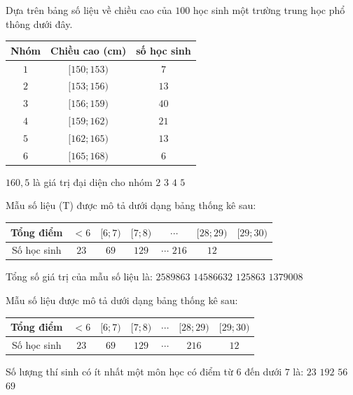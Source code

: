 \begin{ex}%
	Dựa trên bảng số liệu về  chiều cao của $100$ học sinh một trường trung học phổ thông dưới đây.
	\begin{center}
		\begin{tabular}{|c|c|c|}
			\hline 
			Nhóm & Chiều cao  (cm) & số học sinh \\
			 \hline
			$1$ &  $[150;153)$ & $7$ \\
			 \hline
			$2$  & $[153;156)$ & $13$ \\
			 \hline
			 $3$ & $[156;159)$ & $40$ \\
			\hline 
			$4$ &  $[159;162)$ & $21$ \\
			 \hline
			 $5$ & $[162;165)$ & $13$ \\
			 \hline
			$6$ & $[165;168)$ & $6$  \\
			 \hline
		\end{tabular}
	\end{center}
	$160{,}5$ là giá trị đại diện cho  nhóm
	\choice 
		 {$2$}
		{$3$} 
		{\True  $4$}
		 {$5$}
\end{ex}

\begin{ex}%
	Mẫu số liệu (T) được mô tả dưới dạng bảng thống kê  sau:
	\begin{center}
		\begin{tabular}{|c|c|c|c|c|c|c|}
			\hline 
			Tổng  điểm & $<6$ & $[6{;}7)$ & $[7{;}8)$ & $\cdots$ & $[28{;}29)$ & $[29{;}30)$ \\
			 \hline
			Số học sinh & $23$ & $69$ &  $129$ & $\cdots$ $216$ & $12$ \\
			 \hline
		\end{tabular}
	\end{center}
	Tổng số giá trị của mẫu số liệu là: 
	\choice 
		 {$2589863$}
		{$14586632$} 
		 {$125863$}
		{\True $1379008$} 
\end{ex}

\begin{ex}%
	Mẫu số liệu được mô tả dưới  dạng bảng thống kê sau:
	\begin{center}
		\begin{tabular}{|c|c|c|c|c|c|c|}
			\hline 
			Tổng  điểm & $<6$ & $[6{;}7)$ & $[7{;}8)$ & $\cdots$ & $[28{;}29)$ & $[29{;}30)$ \\
			 \hline
			Số học sinh & $23$ & $69$ & $129$ & $\cdots$ & $216$ & $12$  \\
			\hline 
		\end{tabular}
	\end{center}
	Số lượng thí sinh có ít nhất một  môn học có điểm từ $6$ đến dưới $7$ là:
	\choice 
		{$23$} 
		{$192$} 
		{$56$} 
		{\True  $69$}
\end{ex}


